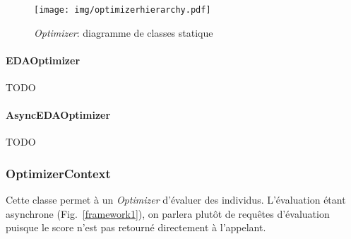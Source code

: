 \documentclass[a4paper, 11pt]{report}
\begin{document}
\begin{figure}[!h]
\centering
\texttt{[image: img/optimizerhierarchy.pdf]}
\caption{\textit{Optimizer}: diagramme de classes statique}
\label{optimizerhierarchy}
\end{figure}

\paragraph{EDAOptimizer} TODO

\paragraph{AsyncEDAOptimizer} TODO




\subsubsection{OptimizerContext}
Cette classe permet à un \textit{Optimizer} d'évaluer des individus. L'évaluation étant asynchrone (Fig.~\ref{framework1}), on parlera plutôt de requêtes d'évaluation puisque le score n'est pas retourné directement à l'appelant.
\end{document}
